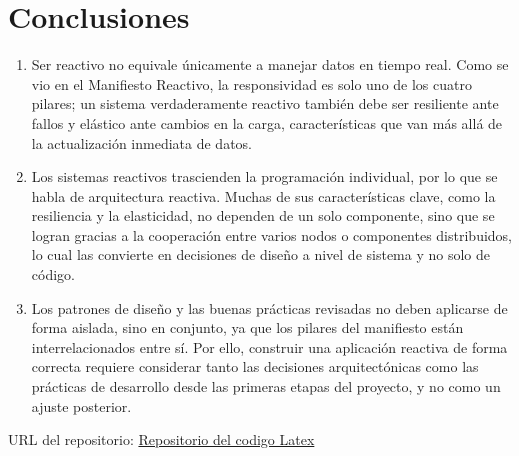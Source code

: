 \documentclass[12pt, letterpaper]{article}
\begin{document}
\section*{Conclusiones}
\begin{enumerate}
  \item Ser reactivo no equivale únicamente a manejar datos en tiempo real. Como se vio en el Manifiesto Reactivo, la responsividad es solo uno de los cuatro pilares; un sistema verdaderamente reactivo también debe ser resiliente ante fallos y elástico ante cambios en la carga, características que van más allá de la actualización inmediata de datos.
  \item Los sistemas reactivos trascienden la programación individual, por lo que se habla de arquitectura reactiva. Muchas de sus características clave, como la resiliencia y la elasticidad, no dependen de un solo componente, sino que se logran gracias a la cooperación entre varios nodos o componentes distribuidos, lo cual las convierte en decisiones de diseño a nivel de sistema y no solo de código.
  \item Los patrones de diseño y las buenas prácticas revisadas no deben aplicarse de forma aislada, sino en conjunto, ya que los pilares del manifiesto están interrelacionados entre sí. Por ello, construir una aplicación reactiva de forma correcta requiere considerar tanto las decisiones arquitectónicas como las prácticas de desarrollo desde las primeras etapas del proyecto, y no como un ajuste posterior.
\end{enumerate}

\printbibliography[title={Bibliografía}]

\vspace{1em}
\noindent URL del repositorio: \href{https://github.com/estiven-lg/seminario-de-tecnologias-de-informacion-22026-7690-047-A}{Repositorio del codigo Latex}
\end{document}
